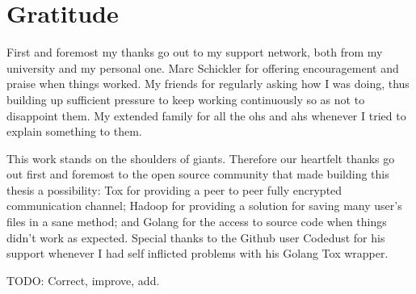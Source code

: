 \section*{Gratitude}
\label{chap:gratitude}

First and foremost my thanks go out to my support network, both from my university and my personal one.
Marc Schickler for offering encouragement and praise when things worked.
My friends for regularly asking how I was doing, thus building up sufficient pressure to keep working continuously so as not to disappoint them.
My extended family for all the ohs and ahs whenever I tried to explain something to them.

This work stands on the shoulders of giants.
Therefore our heartfelt thanks go out first and foremost to the open source community that made building this thesis a possibility: Tox for providing a peer to peer fully encrypted communication channel; Hadoop for providing a solution for saving many user's files in a sane method; and Golang for the access to source code when things didn't work as expected.
Special thanks to the Github user Codedust for his support whenever I had self inflicted problems with his Golang Tox wrapper.

TODO: Correct, improve, add.
